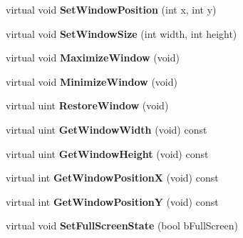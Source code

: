 \begin{DoxyCompactItemize}
\item 
virtual void {\bfseries Set\+Window\+Position} (int x, int y)\hypertarget{class_w_window_component_a6d49d7d1326fb6542aee92121e857120}{}\label{class_w_window_component_a6d49d7d1326fb6542aee92121e857120}

\item 
virtual void {\bfseries Set\+Window\+Size} (int width, int height)\hypertarget{class_w_window_component_a7ac0703ed55619e9c45223ef5709bd72}{}\label{class_w_window_component_a7ac0703ed55619e9c45223ef5709bd72}

\item 
virtual void {\bfseries Maximize\+Window} (void)\hypertarget{class_w_window_component_abdc826c2c1a81cc26e6814aead96f3ff}{}\label{class_w_window_component_abdc826c2c1a81cc26e6814aead96f3ff}

\item 
virtual void {\bfseries Minimize\+Window} (void)\hypertarget{class_w_window_component_aa563f9b0c50ebba1d5b79801f496e013}{}\label{class_w_window_component_aa563f9b0c50ebba1d5b79801f496e013}

\item 
virtual uint {\bfseries Restore\+Window} (void)\hypertarget{class_w_window_component_a21ff7631bd80aa9cc7d488ce893568ce}{}\label{class_w_window_component_a21ff7631bd80aa9cc7d488ce893568ce}

\item 
virtual uint {\bfseries Get\+Window\+Width} (void) const \hypertarget{class_w_window_component_ab000f587f6e77c54effab339e6278cd1}{}\label{class_w_window_component_ab000f587f6e77c54effab339e6278cd1}

\item 
virtual uint {\bfseries Get\+Window\+Height} (void) const \hypertarget{class_w_window_component_a513aaa6aaa8c68f6cec4e66f23922334}{}\label{class_w_window_component_a513aaa6aaa8c68f6cec4e66f23922334}

\item 
virtual int {\bfseries Get\+Window\+PositionX} (void) const \hypertarget{class_w_window_component_a6fcae6e2d4f8a673ea2e7449106af1e4}{}\label{class_w_window_component_a6fcae6e2d4f8a673ea2e7449106af1e4}

\item 
virtual int {\bfseries Get\+Window\+PositionY} (void) const \hypertarget{class_w_window_component_a0ac781b7b28d3886c7da4e5e20acc03a}{}\label{class_w_window_component_a0ac781b7b28d3886c7da4e5e20acc03a}

\item 
virtual void {\bfseries Set\+Full\+Screen\+State} (bool b\+Full\+Screen)\hypertarget{class_w_window_component_a9e0fb20983fa791631a7ba2cbc0b270c}{}\label{class_w_window_component_a9e0fb20983fa791631a7ba2cbc0b270c}


\end{DoxyCompactItemize}
